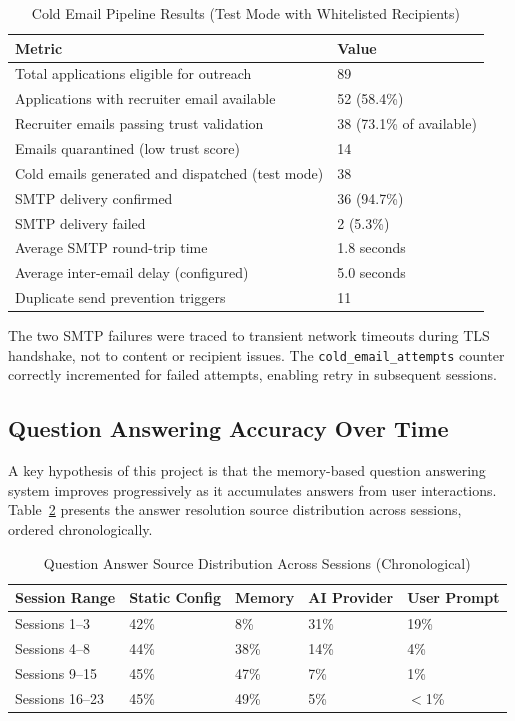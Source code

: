 \documentclass[12pt, a4paper, oneside]{report}
\begin{document}
\begin{table}[H]
\centering
\caption{Cold Email Pipeline Results (Test Mode with Whitelisted Recipients)}
\label{tab:exp-cold-email}
\small
\begin{tabularx}{\textwidth}{|l|X|}
\hline
\textbf{Metric} & \textbf{Value} \\
\hline
Total applications eligible for outreach & 89 \\
\hline
Applications with recruiter email available & 52 (58.4\%) \\
\hline
Recruiter emails passing trust validation & 38 (73.1\% of available) \\
\hline
Emails quarantined (low trust score) & 14 \\
\hline
Cold emails generated and dispatched (test mode) & 38 \\
\hline
SMTP delivery confirmed & 36 (94.7\%) \\
\hline
SMTP delivery failed & 2 (5.3\%) \\
\hline
Average SMTP round-trip time & 1.8 seconds \\
\hline
Average inter-email delay (configured) & 5.0 seconds \\
\hline
Duplicate send prevention triggers & 11 \\
\hline
\end{tabularx}
\end{table}

The two SMTP failures were traced to transient network timeouts during TLS handshake, not to content or recipient issues. The \texttt{cold\_email\_attempts} counter correctly incremented for failed attempts, enabling retry in subsequent sessions.

\subsection{Question Answering Accuracy Over Time}

A key hypothesis of this project is that the memory-based question answering system improves progressively as it accumulates answers from user interactions. Table~\ref{tab:exp-qa-convergence} presents the answer resolution source distribution across sessions, ordered chronologically.

\begin{table}[H]
\centering
\caption{Question Answer Source Distribution Across Sessions (Chronological)}
\label{tab:exp-qa-convergence}
\small
\begin{tabularx}{\textwidth}{|l|X|X|X|X|}
\hline
\textbf{Session Range} & \textbf{Static Config} & \textbf{Memory} & \textbf{AI Provider} & \textbf{User Prompt} \\
\hline
Sessions 1--3 & 42\% & 8\% & 31\% & 19\% \\
\hline
Sessions 4--8 & 44\% & 38\% & 14\% & 4\% \\
\hline
Sessions 9--15 & 45\% & 47\% & 7\% & 1\% \\
\hline
Sessions 16--23 & 45\% & 49\% & 5\% & $<$1\% \\
\hline
\end{tabularx}
\end{table}
\end{document}

